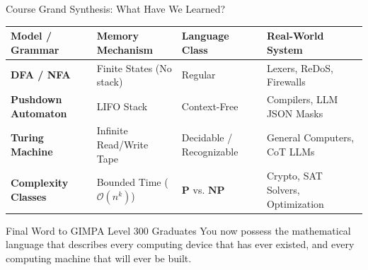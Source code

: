 \documentclass[aspectratio=169,10pt]{beamer}
\begin{document}
\begin{frame}{Course Grand Synthesis: What Have We Learned?}
    \begin{center}
    \small
    \begin{tabular}{llll}
        \toprule
        \textbf{Model / Grammar} & \textbf{Memory Mechanism} & \textbf{Language Class} & \textbf{Real-World System} \\
        \midrule
        \textbf{DFA / NFA} & Finite States (No stack) & Regular & Lexers, ReDoS, Firewalls \\
        \textbf{Pushdown Automaton} & LIFO Stack & Context-Free & Compilers, LLM JSON Masks \\
        \textbf{Turing Machine} & Infinite Read/Write Tape & Decidable / Recognizable & General Computers, CoT LLMs \\
        \textbf{Complexity Classes} & Bounded Time ($\mathcal{O}(n^k)$) & $\mathbf{P}$ vs. $\mathbf{NP}$ & Crypto, SAT Solvers, Optimization \\
        \bottomrule
    \end{tabular}
    \end{center}
    \vspace{0.2cm}
    \begin{exampleblock}{Final Word to GIMPA Level 300 Graduates}
        You now possess the mathematical language that describes every computing device that has ever existed, and every computing machine that will ever be built.
    \end{exampleblock}
\end{frame}
\end{document}
